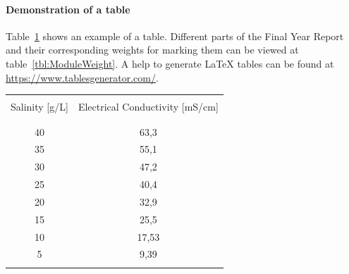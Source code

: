 \paragraph{Demonstration of a table}
Table~\ref{tbl:Salinity-EC} shows an example of a table. Different parts of the Final Year Report and their corresponding weights for marking them can be viewed at table~\ref{tbl:ModuleWeight}. A help to generate LaTeX tables can be found at \url{https://www.tablesgenerator.com/}.

\begin{table}%
	\centering
	\label{tbl:Salinity-EC}
	\begin{tabular}{cc}
		\hline \\
		Salinity [g/L]	& 	Electrical Conductivity [mS/cm]\\    
		\\
		\hline \\
		40	&	63,3	\\
		35	&	55,1	\\
		30	&	47,2	\\
		25	&	40,4	\\
		20	&	32,9	\\
		15	&	25,5	\\
		10	&	17,53	\\
		5	&	9,39	\\
		\hline \\
	\end{tabular}  
\end{table}
	
